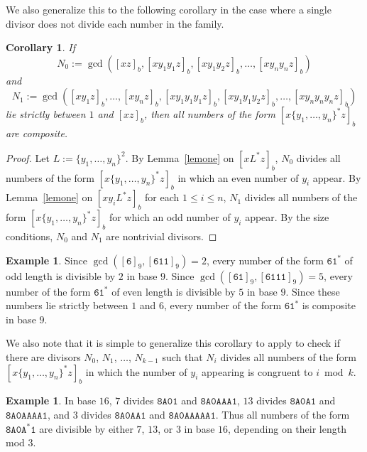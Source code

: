 \documentclass[12pt]{article}
\theoremstyle{plain}
\newtheorem{corollary}[theorem]{Corollary}
\theoremstyle{definition}
\newtheorem{example}[theorem]{Example}
\theoremstyle{remark}
\newcommand{\0}{\mathtt{0}}
\newcommand{\1}{\mathtt{1}}
\newcommand{\2}{\mathtt{2}}
\newcommand{\3}{\mathtt{3}}
\newcommand{\4}{\mathtt{4}}
\newcommand{\5}{\mathtt{5}}
\newcommand{\6}{\mathtt{6}}
\newcommand{\7}{\mathtt{7}}
\newcommand{\8}{\mathtt{8}}
\newcommand{\9}{\mathtt{9}}
\newcommand{\A}{\mathtt{A}}
\begin{document}
We also generalize this to the following corollary in the case where 
a single divisor does not divide each number in the family.
\begin{corollary}\label{cortwo}
If \[N_0:=\gcd([xz]_b,[xy_1y_1z]_b,[xy_1y_2z]_b,\dotsc,[xy_ny_nz]_b)\] and 
\[N_1:=\gcd([xy_1z]_b,\dotsc,[xy_nz]_b,[xy_1y_1y_1z]_b,[xy_1y_1y_2z]_b,\dotsc,[xy_ny_ny_nz]_b)\]
lie strictly between $1$ and $[xz]_b$, then all numbers of the form 
$[x\{y_1,\dotsc,y_n\}^*z]_b$ are composite.
\end{corollary}
\begin{proof}
Let $L:=\{y_1,\dotsc,y_n\}^2$.
By Lemma~\ref{lemone} on $[xL^*z]_b$, $N_0$ divides all numbers of the 
form $[x\{y_1,\dotsc,y_n\}^*z]_b$ in which an even number of $y_i$ appear.
By Lemma~\ref{lemone} on $[xy_iL^*z]_b$ for each $1\leq i\leq n$, $N_1$ 
divides all numbers of the form $[x\{y_1,\dotsc,y_n\}^*z]_b$ for which an 
odd number of $y_i$ appear.
By the size conditions, $N_0$ and $N_1$ are nontrivial divisors.
\end{proof}
\begin{example}
Since $\gcd([\6]_9,[\6\1\1]_9)=2$, every number of the form $\6\1^*$ of 
odd length is divisible by $2$ in base $9$.
Since $\gcd([\6\1]_9,[\6\1\1\1]_9)=5$, every number of the form $\6\1^*$ 
of even length is divisible by $5$ in base $9$.  Since these numbers lie 
strictly between $1$ and $6$, every number of the form $\6\1^*$ is 
composite in base $9$.
\end{example}

We also note that it is simple to generalize this corollary to apply to 
check if there are divisors $N_0$, $N_1$, $\dotsc$, $N_{k-1}$ such that
$N_i$ divides all numbers of the form $[x\{y_1,\dotsc,y_n\}^*z]_b$ in which 
the number of $y_i$ appearing is congruent to $i\bmod k$.
\begin{example}
In base $16$, $7$ divides $\8\A\0\1$ and $\8\A\0\A\A\A\1$, $13$ divides 
$\8\A\0\A\1$ and $\8\A\0\A\A\A\A\1$, and $3$ divides $\8\A\0\A\A\1$ and 
$\8\A\0\A\A\A\A\A\1$.  Thus all numbers of the form $\8\A\0\A^*\1$ are 
divisible by either $7$, $13$, or $3$ in base $16$, depending on their 
length mod $3$.
\end{example}
\end{document}
